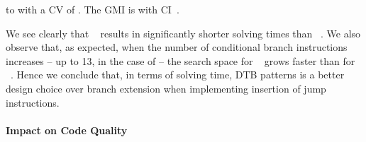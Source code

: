 to
\printMaxSolvingTime{%
  \DualTargetPatternsVsBranchExtPrePlusSolvingTimeSpeedupSolvingTimeAvgMax,
  \DualTargetPatternsVsBranchExtPrePlusSolvingTimeSpeedupBaselineSolvingTimeAvgMax
}
with a \gls{CV} of
\numMaxOf{%
  \DualTargetPatternsVsBranchExtPrePlusSolvingTimeSpeedupSolvingTimeCvMax,
  \DualTargetPatternsVsBranchExtPrePlusSolvingTimeSpeedupBaselineSolvingTimeCvMax
}.
The \gls{GMI} is \printGMI{%
  \DualTargetPatternsVsBranchExtPrePlusSolvingTimeSpeedupPrePlusSolvingTimeRegularSpeedupGmean%
} with \gls{CI}~\printGMICI{%
  \DualTargetPatternsVsBranchExtPrePlusSolvingTimeSpeedupPrePlusSolvingTimeRegularSpeedupCiMin%
}{%
  \DualTargetPatternsVsBranchExtPrePlusSolvingTimeSpeedupPrePlusSolvingTimeRegularSpeedupCiMax%
}.

We see clearly that ~ results
in significantly shorter solving times than ~.
%
We also observe that, as expected, when the number of conditional branch
\glspl{instruction} increases -- up to \num{13}, in the case of
 -- the \gls{search space} for ~ grows faster than for ~.
%
Hence we conclude that, in terms of solving time,
\glspl{DTB pattern} is a better design choice over \gls{branch extension} when
implementing insertion of jump \glspl{instruction}.


\paragraph{Impact on Code Quality}



